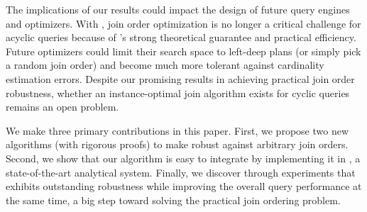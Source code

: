 The implications of our results could impact the design of future query engines and optimizers. With \RPT, join order optimization is no longer a critical challenge for acyclic queries because of \rpt's strong theoretical guarantee and practical efficiency. Future optimizers could limit their search space to left-deep plans (or simply pick a random join order) and become much more tolerant against cardinality estimation errors. Despite our promising results in achieving practical join order robustness, whether an instance-optimal join algorithm exists for cyclic queries remains an open problem.

We make three primary contributions in this paper. First, we propose two new algorithms (with rigorous proofs) to make \PT robust against arbitrary join orders. Second, we show that our \RPT algorithm is easy to integrate by implementing it in \duckdb, a state-of-the-art analytical system. Finally, we discover through experiments that \rpt exhibits outstanding robustness while improving the overall query performance at the same time, a big step toward solving the practical join ordering problem.




